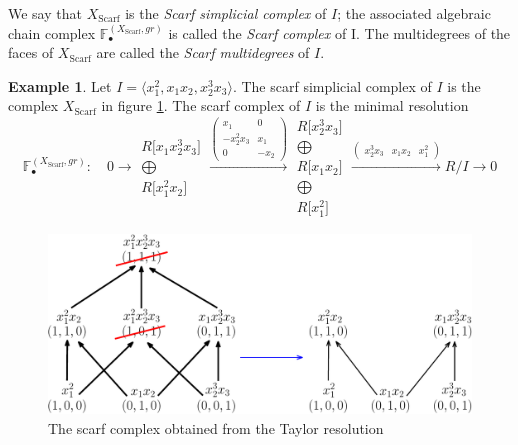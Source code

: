 \documentclass[paper=a4, fontsize=11pt]{scrartcl} %
\theoremstyle{plain}
\theoremstyle{definition}
\newtheorem{exmp}[thm]{Example}
\begin{document}
We say that $X_{\text{Scarf}}$ is the \textit{Scarf simplicial complex} of $I$; the associated algebraic chain complex $\mathbb{F}_{\bullet}^{(X_{\text{Scarf}},gr)}$ is called the \textit{Scarf complex} of I. The multidegrees of the faces of $X_{\text{Scarf}}$ are called the \textit{Scarf multidegrees} of $I$.

\begin{exmp}
Let $I = \langle x_{1}^2, x_{1} x_{2}, x_{2}^3 x_{3} \rangle$. The scarf simplicial complex of $I$ is the complex $X_{\text{Scarf}}$ in figure \ref{fig:scarf}. The scarf complex of $I$ is the minimal resolution $$\mathbb{F}_{\bullet}^{(X_{\text{Scarf}},gr)}: \quad
0 \rightarrow \begin{matrix}
R \lbrack x_{1}x_{2}^{3}x_{3} \rbrack \\ \bigoplus \\
R \lbrack x_{1}^{2}x_{2} \rbrack
\end{matrix}
\xrightarrow{\left( \begin{matrix}
x_{1} & 0 \\
-x_{2}^{2}x_{3} & x_{1} \\
0 & -x_{2}
\end{matrix} \right)}\begin{matrix}
R \lbrack x_{2}^{3}x_{3} \rbrack \\ \bigoplus \\
R \lbrack x_{1}x_{2} \rbrack \\ \bigoplus \\
R \lbrack x_{1}^{2} \rbrack
\end{matrix}
\xrightarrow{\left( \begin{matrix}
x_{2}^{3}x_{3} & x_{1}x_{2} & x_{1}^{2}
\end{matrix} \right)} R/I \rightarrow 0
$$



\begin{figure}[!htb]
\centering
\includegraphics[scale=0.5]{./figures/scarf.pdf}
\caption{The scarf complex obtained from the Taylor resolution}
\label{fig:scarf}
\end{figure}

\end{exmp}
\end{document}
